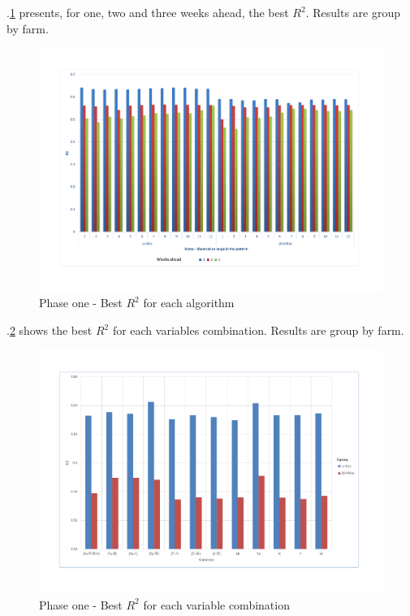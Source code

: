 \documentclass[review]{elsarticle}
\begin{document}
\figurename $.$\ref{figura5} presents, for one, two and three weeks ahead, the best $R^2$. Results are group by farm.

\begin{figure}[H] 
 \centering
 \includegraphics[scale=.5]{Phase_one_Best_R2_for_each_number_of_observation_range_in_the_patterm}
 \caption{Phase one - Best $R^2$ for each algorithm} 
 \label{figura5} 
\end{figure}

\figurename $.$\ref{figura6} shows the best $R^2$ for each variables combination. Results are group by farm.

\begin{figure}[H] 
 \centering
 \includegraphics[scale=.5]{Phase_one_Best_R2_for_variables}
 \caption{Phase one - Best $R^2$ for each variable combination} 
 \label{figura6} 
\end{figure}
\end{document}
